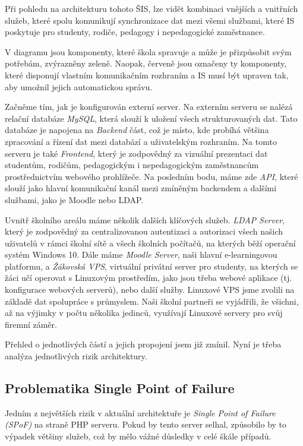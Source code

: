 \documentclass[FM,Proj]{tulthesis}
\begin{document}
Při pohledu na architekturu tohoto ŠIS, lze vidět kombinaci vnějších a vnitřních služeb,
které spolu komunikují synchronizace dat mezi všemi službami, které IS poskytuje pro studenty,
rodiče, pedagogy i nepedagogické zaměstnance.

V diagramu jsou komponenty, které škola spravuje a může je přizpůsobit svým potřebám,
zvýrazněny zeleně. Naopak, červeně jsou označeny ty komponenty, které disponují vlastním
komunikačním rozhraním a IS musí být upraven tak, aby umožnil jejich automatickou správu.

Začněme tím, jak je konfigurován externí server.
Na externím serveru se nalézá relační databáze \textit{MySQL}, která slouží k uložení všech  
strukturovaných dat. Tato databáze je napojena na \textit{Backend} část, což je místo, kde probíhá
většina zpracování a řízení dat mezi databází a uživatelským rozhraním. Na tomto serveru je také
\textit{Frontend}, který je zodpovědný za vizuální prezentaci dat studentům, rodičům, pedagogickým i
nepedagogickým zaměstnancům prostřednictvím webového prohlížeče. Na posledním bodu, máme zde \textit{API},
které slouží jako hlavní komunikační kanál mezi zmíněným backendem a dalšími službami,
jako je Moodle nebo LDAP.

Uvnitř školního areálu máme několik dalších klíčových služeb. \textit{LDAP Server}, který je
zodpovědný za centralizovanou autentizaci a autorizaci všech našich uživatelů v rámci školní
sítě a všech školních počítačů, na kterých běží operační systém Windows 10. Dále máme \textit{Moodle Server},
naši hlavní e-learningovou platformu, a \textit{Žákovská VPS}, 
virtuální privátní server pro studenty, na kterých se žáci učí operovat s Linuxovým prostředím,
jako jsou třeba webové aplikace (tj. konfigurace webových serverů), nebo další služby.
Linuxové VPS jsme zvolili na základě dat spolupráce s průmyslem. Naši školní partneři se vyjádřili,
že všichni, až na výjimky v počtu několika jedinců, využívají Linuxové servery pro svůj firemní záměr. 

Přehled o jednotlivých částí a jejich propojení jsem již zmínil. Nyní je třeba analýza jednotlivých rizik architektury.

\subsection*{Problematika Single Point of Failure}
\label{section:problematika-single-point-of-failure}

Jedním z největších rizik v aktuální architektuře je \textit{Single Point of Failure (SPoF)} na straně PHP serveru. 
Pokud by tento server selhal, způsobilo by to výpadek většiny služeb, což by mělo vážné důsledky v celé škále případů. 
\end{document}
